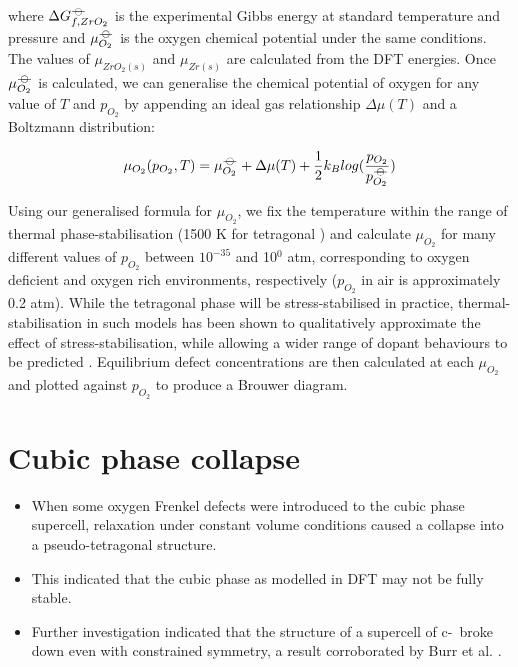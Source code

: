 where $\Delta{G^{{\ensuremath{-\kern-4pt{\ominus}\kern-4pt-}}}_{f, ZrO_2}}$ is the experimental Gibbs energy at standard temperature and pressure and $\mu^{{-\kern-4pt{\ominus}\kern-4pt-}}_{O_2}$ is the oxygen chemical potential under the same conditions. The values of $\mu_{ZrO_2(s)}$ and $\mu_{Zr(s)}$ are calculated from the DFT energies. Once $\mu^{{-\kern-4pt{\ominus}\kern-4pt-}}_{O_2}$ is calculated, we can generalise the chemical potential of oxygen for any value of $T$ and $p_{O_2}$ by appending an ideal gas relationship $\Delta{\mu(T)}$ and a Boltzmann distribution:

\begin{equation}
\mu_{O_2}(p_{O_2},T) = \mu^{{-\kern-4pt{\ominus}\kern-4pt-}}_{O_2} + \Delta{\mu(T)} + \frac{1}{2}{k_B}log(\frac{p_{O_2}}{p^{{-\kern-4pt{\ominus}\kern-4pt-}}_{O_2}})
\end{equation}

Using our generalised formula for $\mu_{O_2}$, we fix the temperature within the range of thermal phase-stabilisation (1500 K for tetragonal \zirconia) and calculate $\mu_{O_2}$ for many different values of $p_{O_2}$ between $10^{-35}$ and 10$^{0}$ atm, corresponding to oxygen deficient and oxygen rich environments, respectively ($p_{O_2}$ in air is approximately 0.2 atm). While the tetragonal phase will be stress-stabilised in practice, thermal-stabilisation in such models has been shown to qualitatively approximate the effect of stress-stabilisation, while allowing a wider range of dopant behaviours to be predicted \cite{Bell2016}. Equilibrium defect concentrations are then calculated at each $\mu_{O_2}$ and plotted against $p_{O_2}$ to produce a Brouwer diagram. 

\section{Cubic phase collapse}

\begin{itemize}
\item When some oxygen Frenkel defects were introduced to the cubic phase supercell, relaxation under constant volume conditions caused a collapse into a pseudo-tetragonal structure.
\item This indicated that the cubic phase as modelled in DFT may not be fully stable.
\item Further investigation indicated that the structure of a supercell of c-\zirconia\ broke down even with constrained symmetry, a result corroborated by Burr et al. \cite{burr2017importance}. 
\end{itemize}

